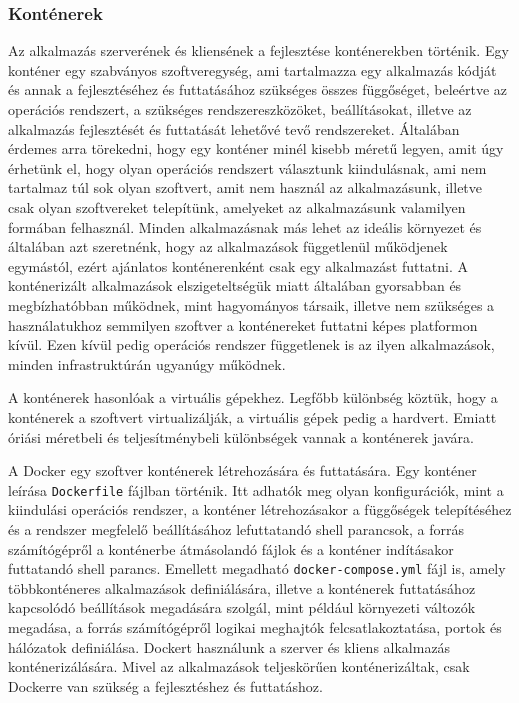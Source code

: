 \documentclass{elteikthesis}
\begin{document}
				\subsubsection{Konténerek}
					Az alkalmazás szerverének és kliensének a fejlesztése konténerekben történik. Egy konténer egy szabványos szoftveregység, ami tartalmazza egy alkalmazás kódját és annak a fejlesztéséhez és futtatásához szükséges összes függőséget, beleértve az operációs rendszert, a szükséges rendszereszközöket, beállításokat, illetve az alkalmazás fejlesztését és futtatását lehetővé tevő rendszereket. Általában érdemes arra törekedni, hogy egy konténer minél kisebb méretű legyen, amit úgy érhetünk el, hogy olyan operációs rendszert választunk kiindulásnak, ami nem tartalmaz túl sok olyan szoftvert, amit nem használ az alkalmazásunk, illetve csak olyan szoftvereket telepítünk, amelyeket az alkalmazásunk valamilyen formában felhasznál. Minden alkalmazásnak más lehet az ideális környezet és általában azt szeretnénk, hogy az alkalmazások függetlenül működjenek egymástól, ezért ajánlatos konténerenként csak egy alkalmazást futtatni. A konténerizált alkalmazások elszigeteltségük miatt általában gyorsabban és megbízhatóbban működnek, mint hagyományos társaik, illetve nem szükséges a használatukhoz semmilyen szoftver a konténereket futtatni képes platformon kívül. Ezen kívül pedig operációs rendszer függetlenek is az ilyen alkalmazások, minden infrastruktúrán ugyanúgy működnek.

					A konténerek hasonlóak a virtuális gépekhez. Legfőbb különbség köztük, hogy a konténerek a szoftvert virtualizálják, a virtuális gépek pedig a hardvert. Emiatt óriási méretbeli és teljesítménybeli különbségek vannak a konténerek javára.

					A Docker egy szoftver konténerek létrehozására és futtatására. Egy konténer leírása \texttt{Dockerfile} fájlban történik. Itt adhatók meg olyan konfigurációk, mint a kiindulási operációs rendszer, a konténer létrehozásakor a függőségek telepítéséhez és a rendszer megfelelő beállításához lefuttatandó shell parancsok, a forrás számítógépről a konténerbe átmásolandó fájlok és a konténer indításakor futtatandó shell parancs. Emellett megadható \texttt{docker-compose.yml} fájl is, amely többkonténeres alkalmazások definiálására, illetve a konténerek futtatásához kapcsolódó beállítások megadására szolgál, mint például környezeti változók megadása, a forrás számítógépről logikai meghajtók felcsatlakoztatása, portok és hálózatok definiálása. Dockert használunk a szerver és kliens alkalmazás konténerizálására. Mivel az alkalmazások teljeskörűen konténerizáltak, csak Dockerre van szükség a fejlesztéshez és futtatáshoz.
\end{document}
